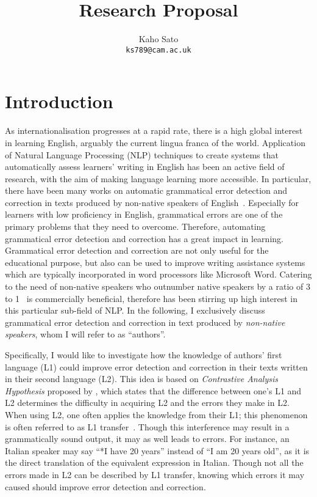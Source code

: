 \documentclass[11pt]{article}
\title{Research Proposal}
\author{
 Kaho Sato\\
  \texttt{ks789@cam.ac.uk}
}
\begin{document}
\maketitle
\section{Introduction}
As internationalisation progresses at a rapid rate, there is a high global interest in learning English, arguably the current lingua franca of the world. Application of Natural Language Processing (NLP) techniques to create systems that automatically assess learners' writing in English has been an active field of research, with the aim of making language learning more accessible. In particular, there have been many works on automatic grammatical error detection and correction in texts produced by non-native speakers of English~\citep{izumi2003automatic, eeg2003automatic, han2006detecting, tetreault2008ups, de2008classifier, gamon2008using, gamon2010using, ng2014conll}. Especially for learners with low proficiency in English, grammatical errors are one of the primary problems that they need to overcome. Therefore, automating grammatical error detection and correction has a great impact in learning. Grammatical error detection and correction are not only useful for the educational purpose, but also can be used to improve writing assistance systems which are typically incorporated in word processors like Microsoft Word. Catering to the need of non-native speakers who outnumber native speakers by a ratio of 3 to 1~\citep{sussex1999david} is commercially beneficial, therefore has been stirring up high interest in this particular sub-field of NLP. In the following, I exclusively discuss grammatical error detection and correction in text produced by \emph{non-native speakers}, whom I will refer to as ``authors''.

Specifically, I would like to investigate how the knowledge of authors' first language (L1) could improve error detection and correction in their texts written in their second language (L2). This idea is based on \emph{Contrastive Analysis Hypothesis} proposed by \cite{lado1957linguistics}, which states that the difference between one's L1 and L2 determines the difficulty in acquiring L2 and the errors they make in L2. 
When using L2, one often applies the knowledge from their L1; this phenomenon is often referred to as L1 transfer~\citep{wanner1982language, frenck1997syntactic, dussias2003syntactic, nitschke2010first}. Though this interference may result in a grammatically sound output, it may as well leads to errors. For instance, an Italian speaker may say ``*I have 20 years'' instead of ``I am 20 years old'', as it is the direct translation of the equivalent expression in Italian. Though not all the errors made in L2 can be described by L1 transfer, knowing which errors it may caused should improve error detection and correction.
\end{document}
